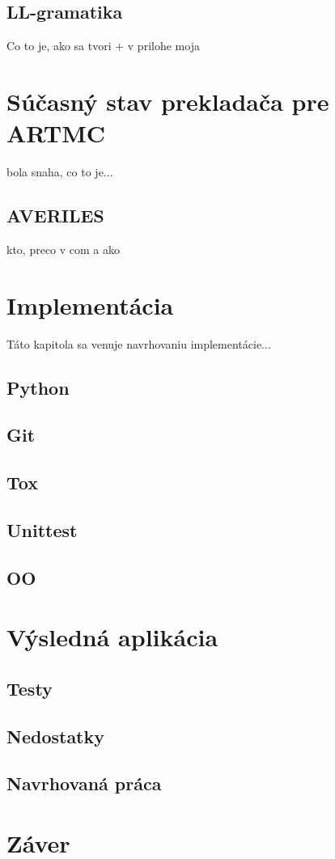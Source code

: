 \section{LL-gramatika}
Co to je, ako sa tvori + v prilohe moja
\chapter{Súčasný stav prekladača pre ARTMC}
bola snaha, co to je...
\section{AVERILES}
kto, preco v com a ako
\chapter{Implementácia}
Táto kapitola sa venuje navrhovaniu implementácie...
\section{Python}
\section{Git}
\section{Tox}
\section{Unittest}
\section{OO}
\chapter{Výsledná aplikácia}
\section{Testy}
\section{Nedostatky}
\section{Navrhovaná práca}
\chapter{Záver}

